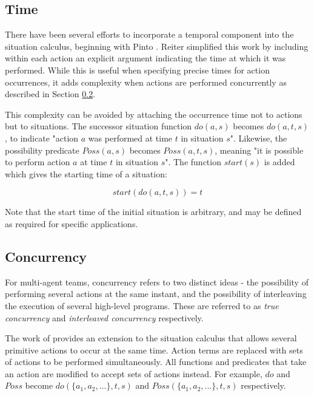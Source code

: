 \documentclass[letterpaper]{article}
\begin{document}
\subsection{Time}

There have been several efforts to incorporate a temporal component
into the situation calculus, beginning with Pinto \cite{pinto94temporal}.
Reiter \cite{reiter96sc_nat_conc} simplified this work by including
within each action an explicit argument indicating the time at which
it was performed. While this is useful when specifying precise times
for action occurrences, it adds complexity when actions are performed
concurrently as described in Section \ref{sub:Concurrency}.

This complexity can be avoided by attaching the occurrence time not
to actions but to situations. The successor situation function $do(a,s)$
becomes $do(a,t,s)$, to indicate "action $a$ was performed at
time $t$ in situation $s$". Likewise, the possibility predicate
$Poss(a,s)$ becomes $Poss(a,t,s)$, meaning "it is possible to
perform action $a$ at time $t$ in situation $s$". The function
$start(s)$ is added which gives the starting time of a situation:

\[
start(do(a,t,s))=t
\]


Note that the start time of the initial situation is arbitrary, and
may be defined as required for specific applications.


\subsection{Concurrency}

\label{sub:Concurrency}

For multi-agent teams, concurrency refers to two distinct ideas -
the possibility of performing several actions at the same instant,
and the possibility of interleaving the execution of several high-level
programs. These are referred to as \emph{true concurrency} and \emph{interleaved
concurrency} respectively.

The work of \cite{lin92sc_conc,reiter96sc_nat_conc} provides an extension
to the situation calculus that allows several primitive actions to
occur at the same time. Action terms are replaced with sets of actions
to be performed simultaneously. All functions and predicates that
take an action are modified to accept sets of actions instead. For
example, $do$ and $Poss$ become $do(\{ a_{1},a_{2},...\},t,s)$
and $Poss(\{ a_{1},a_{2},...\},t,s)$ respectively.
\end{document}
